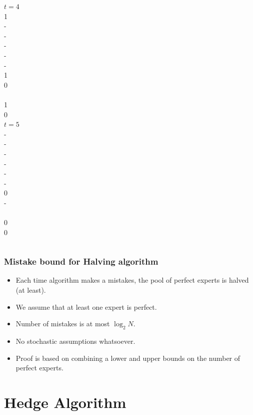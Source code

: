 \documentclass[handout]{beamer}
\begin{document}
\begin{frame}
\begin{columns}
\column[t]{1cm}	    		     
 $t=4$ \\ 1 \\ - \\ -  \\ - \\ - \\ - \\ 1  \\ 0 \\ ~ \\
\color<14>{red} 1 \\
 0 \\
		    			     
\column[t]{1cm}	    		     
 $t=5$ \\ - \\ - \\ -  \\ - \\ - \\ - \\ 0  \\ - \\ ~ \\
\color<17>{red} 0 \\
 0 \\

\end{columns} 
\end{frame} 

\begin{frame}
\frametitle{Mistake bound for Halving algorithm}
\begin{itemize}
\item 
Each time algorithm makes a mistakes, the pool of perfect experts is halved (at least).
\item
We assume that at least one expert is perfect.
\item
Number of mistakes is at most $\log_2 N$.
\item
No stochastic assumptions whatsoever.
\item
Proof is based on combining a lower and upper bounds on the number of perfect experts.
\end{itemize}
\end{frame}

\section{Hedge Algorithm}
\end{document}
